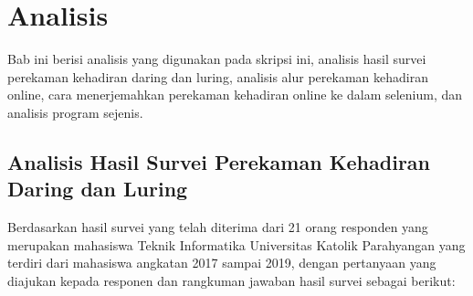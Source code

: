 \chapter{Analisis}
\label{chap:analisis}
Bab ini berisi analisis yang digunakan pada skripsi ini, analisis hasil survei perekaman kehadiran daring dan luring, analisis alur perekaman kehadiran online, cara menerjemahkan perekaman kehadiran online ke dalam selenium, dan analisis program sejenis.

\section{Analisis Hasil Survei Perekaman Kehadiran Daring dan Luring}
\label{sec:survei} 
Berdasarkan hasil survei yang telah diterima dari 21 orang responden yang merupakan mahasiswa Teknik Informatika Universitas Katolik
Parahyangan yang terdiri dari mahasiswa angkatan 2017 sampai 2019, dengan pertanyaan yang diajukan kepada responen dan rangkuman jawaban hasil survei sebagai berikut:
